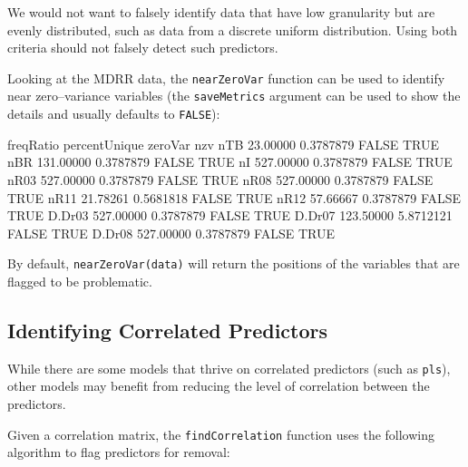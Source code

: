 \documentclass[12pt]{article}
\begin{document}
We would not want to falsely identify data that have low granularity but are evenly distributed, such as data from a discrete uniform distribution. Using both criteria should not falsely detect such predictors.

Looking at the MDRR data, the \texttt{nearZeroVar} function can be used to identify near zero--variance variables (the \texttt{saveMetrics} argument can be used to show the details and usually defaults to \texttt{FALSE}):

\begin{small}
\begin{Schunk}
\begin{Soutput}
       freqRatio percentUnique zeroVar  nzv
nTB     23.00000     0.3787879   FALSE TRUE
nBR    131.00000     0.3787879   FALSE TRUE
nI     527.00000     0.3787879   FALSE TRUE
nR03   527.00000     0.3787879   FALSE TRUE
nR08   527.00000     0.3787879   FALSE TRUE
nR11    21.78261     0.5681818   FALSE TRUE
nR12    57.66667     0.3787879   FALSE TRUE
D.Dr03 527.00000     0.3787879   FALSE TRUE
D.Dr07 123.50000     5.8712121   FALSE TRUE
D.Dr08 527.00000     0.3787879   FALSE TRUE
\end{Soutput}
\end{Schunk}
\end{small}


By default, \texttt{nearZeroVar(data)} will return the positions of the variables that are flagged to be problematic.

\subsection{Identifying Correlated Predictors}

While there are some models that thrive on correlated predictors (such as \texttt{pls}), other models may benefit from reducing the level of correlation between the predictors. 

Given a correlation matrix, the \texttt{findCorrelation} function uses the following algorithm to flag predictors for removal:

\begin{algorithm}[H]
	\SetLine
\end{algorithm}
\end{document}
